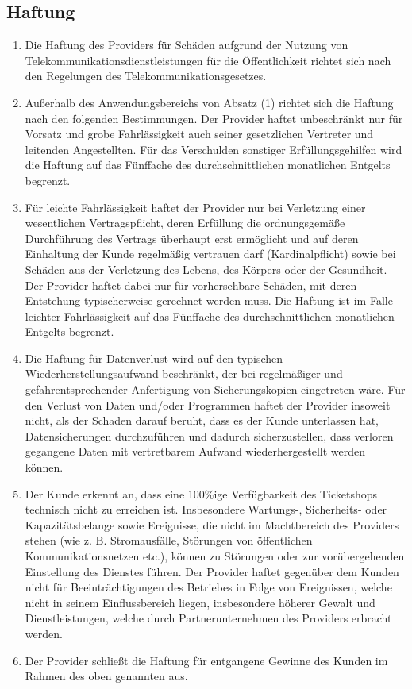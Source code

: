 \documentclass{terms}
\begin{document}
\subsection{Haftung}
\begin{enumerate}
\item Die Haftung des Providers für Schäden aufgrund der Nutzung von Telekommunikationsdienstleistungen für die Öffentlichkeit richtet sich nach den Regelungen des Telekommunikationsgesetzes.
\item Außerhalb des Anwendungsbereichs von Absatz (1) richtet sich die Haftung nach den folgenden Bestimmungen. Der Provider haftet unbeschränkt nur für Vorsatz und grobe Fahrlässigkeit auch seiner gesetzlichen Vertreter und leitenden Angestellten. Für das Verschulden sonstiger Erfüllungsgehilfen wird die Haftung auf das Fünffache des durchschnittlichen monatlichen Entgelts begrenzt.
\item Für leichte Fahrlässigkeit haftet der Provider nur bei Verletzung einer wesentlichen Vertragspflicht, deren Erfüllung die ordnungsgemäße Durchführung des Vertrags überhaupt erst ermöglicht und auf deren Einhaltung der Kunde regelmäßig vertrauen darf (Kardinalpflicht) sowie bei Schäden aus der Verletzung des Lebens, des Körpers oder der Gesundheit. Der Provider haftet dabei nur für vorhersehbare Schäden, mit deren Entstehung typischerweise gerechnet werden muss. Die Haftung ist im Falle leichter Fahrlässigkeit auf das Fünffache des durchschnittlichen monatlichen Entgelts begrenzt.
\item Die Haftung für Datenverlust wird auf den typischen Wiederherstellungsaufwand beschränkt, der bei regelmäßiger und gefahrentsprechender Anfertigung von Sicherungskopien eingetreten wäre. Für den Verlust von Daten und/oder Programmen haftet der Provider insoweit nicht, als der Schaden darauf beruht, dass es der Kunde unterlassen hat, Datensicherungen durchzuführen und dadurch sicherzustellen, dass verloren gegangene Daten mit vertretbarem Aufwand wiederhergestellt werden können.
\item Der Kunde erkennt an, dass eine 100\%ige Verfügbarkeit des Ticketshops technisch nicht zu erreichen ist. Insbesondere Wartungs-, Sicherheits- oder Kapazitätsbelange sowie Ereignisse, die nicht im Machtbereich des Providers stehen (wie z. B. Stromausfälle, Störungen von öffentlichen Kommunikationsnetzen etc.), können zu Störungen oder zur vorübergehenden Einstellung des Dienstes führen. Der Provider haftet gegenüber dem Kunden nicht für Beeinträchtigungen des Betriebes in Folge von Ereignissen, welche nicht in seinem Einflussbereich liegen, insbesondere höherer Gewalt und Dienstleistungen, welche durch Partnerunternehmen des Providers erbracht werden.
\item Der Provider schließt die Haftung für entgangene Gewinne des Kunden im Rahmen des oben genannten aus.
\end{enumerate}
\end{document}
